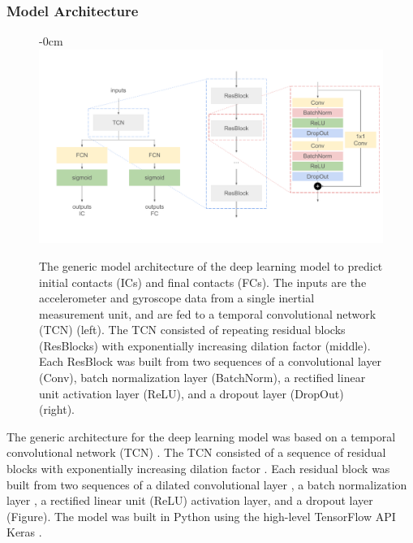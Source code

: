 \documentclass[sensors,article,submit,pdftex,moreauthors]{Definitions/mdpi}
\begin{document}
\subsubsection{Model Architecture}
\begin{figure}[H]
	\begin{adjustwidth}{-\extralength}{0cm}
		\centering
		\includegraphics[width=13.5cm]{fig/tcn_model_arch}
	\end{adjustwidth}
	\caption{The generic model architecture of the deep learning model to predict initial contacts (ICs) and final contacts (FCs). The inputs are the accelerometer and gyroscope data from a single inertial measurement unit, and are fed to a temporal convolutional network (TCN) (left). The TCN consisted of repeating residual blocks (ResBlocks) with exponentially increasing dilation factor (middle). Each ResBlock was built from two sequences of a convolutional layer (Conv), batch normalization layer (BatchNorm), a rectified linear unit activation layer (ReLU), and a dropout layer (DropOut) (right). \label{fig:tcn_model_arch}}
\end{figure}
The generic architecture for the deep learning model was based on a temporal convolutional network (TCN) \cite{Bai2018,Remy2020,Filtjens2020}. The TCN consisted of a sequence of residual blocks with exponentially increasing dilation factor \cite{YuKoltun2016,Bai2018}. Each residual block was built from two sequences of a dilated convolutional layer \cite{YuKoltun2016}, a batch normalization layer \cite{Ioffe2015}, a rectified linear unit (ReLU) activation layer, and a dropout layer \cite{Srivastava2014} (Figure). The model was built in Python \cite{VanRossum2009} using the high-level TensorFlow API Keras \cite{Remy2020,Chollet2015}.
\end{document}
